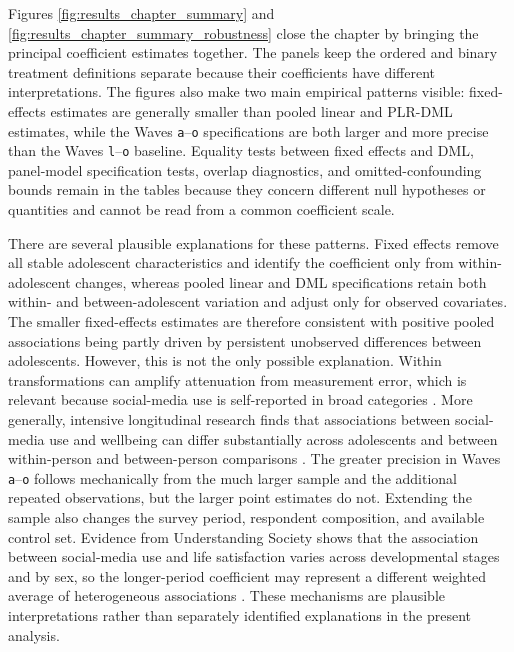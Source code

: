 \documentclass[11pt,oneside,a4paper]{book}
\begin{document}
Figures \ref{fig:results_chapter_summary} and \ref{fig:results_chapter_summary_robustness} close the chapter by bringing the principal coefficient estimates together. The panels keep the ordered and binary treatment definitions separate because their coefficients have different interpretations. The figures also make two main empirical patterns visible: fixed-effects estimates are generally smaller than pooled linear and PLR-DML estimates, while the Waves \texttt{a}--\texttt{o} specifications are both larger and more precise than the Waves \texttt{l}--\texttt{o} baseline. Equality tests between fixed effects and DML, panel-model specification tests, overlap diagnostics, and omitted-confounding bounds remain in the tables because they concern different null hypotheses or quantities and cannot be read from a common coefficient scale.

There are several plausible explanations for these patterns. Fixed effects remove all stable adolescent characteristics and identify the coefficient only from within-adolescent changes, whereas pooled linear and DML specifications retain both within- and between-adolescent variation and adjust only for observed covariates. The smaller fixed-effects estimates are therefore consistent with positive pooled associations being partly driven by persistent unobserved differences between adolescents. However, this is not the only possible explanation. Within transformations can amplify attenuation from measurement error, which is relevant because social-media use is self-reported in broad categories \citep{griliches1986errors,wooldridge2010panel}. More generally, intensive longitudinal research finds that associations between social-media use and wellbeing can differ substantially across adolescents and between within-person and between-person comparisons \citep{beyens2020effect}. The greater precision in Waves \texttt{a}--\texttt{o} follows mechanically from the much larger sample and the additional repeated observations, but the larger point estimates do not. Extending the sample also changes the survey period, respondent composition, and available control set. Evidence from Understanding Society shows that the association between social-media use and life satisfaction varies across developmental stages and by sex, so the longer-period coefficient may represent a different weighted average of heterogeneous associations \citep{orben2022windows}. These mechanisms are plausible interpretations rather than separately identified explanations in the present analysis.
\end{document}
